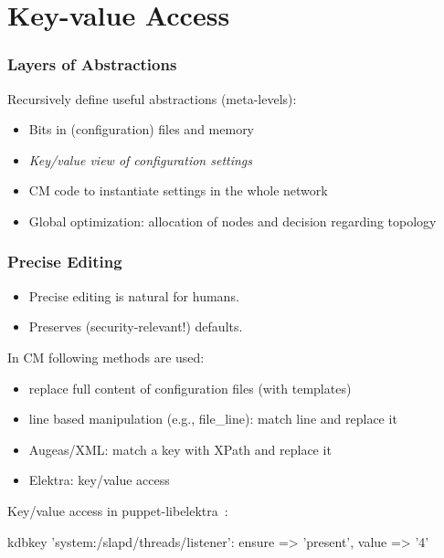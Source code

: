 \section{Key-value Access}

\begin{frame}
	\frametitle{Layers of Abstractions}

	Recursively define useful abstractions (meta-levels):

	\begin{itemize}[<+-| alert@+>]
	\item Bits in (configuration) files and memory
	\item \emph{Key/value view of configuration settings}
	\vspace{1em}
	\item CM code to instantiate settings in the whole network
	\item Global optimization: allocation of nodes and decision regarding topology
	\end{itemize}
\end{frame}

\begin{frame}
	\frametitle{Precise Editing}

	\begin{itemize}[<+-| alert@+>]
	\item Precise editing is natural for humans.
	\item Preserves (security-relevant!) defaults.
	\end{itemize}

	\vspace{1cm}
	\pause[\thebeamerpauses]
	In CM following methods are used:

	\begin{itemize}[<+-| alert@+>]
	\item replace full content of configuration files (with templates)
	\item line based manipulation (e.g., file\_line): match line and replace it
	\item Augeas/XML: match a key with XPath and replace it
	\item Elektra: key/value access
	\end{itemize}
\end{frame}

\begin{frame}[fragile]
	Key/value access in puppet-libelektra~\cite{raab2020unified}:
	\vspace{1cm}

	\begin{code}[morekeywords={kdbkey,kdbmount,ensure,value},gobble=4]
	kdbkey {'system:/slapd/threads/listener':
		ensure => 'present',
		value => '4'
	}
	\end{code}
\end{frame}

